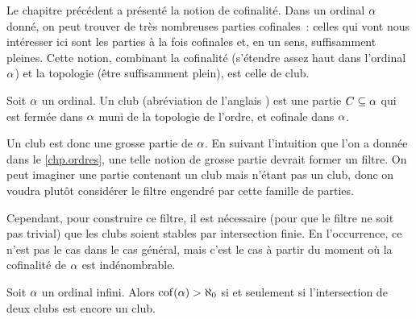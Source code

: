 Le chapitre précédent a présenté la notion de cofinalité. Dans un ordinal
$\alpha$ donné, on peut trouver de très nombreuses parties cofinales~: celles
qui vont nous intéresser ici sont les parties à la fois cofinales et, en un
sens, \og suffisamment pleines\fg. Cette notion, combinant la cofinalité
(s'étendre assez haut dans l'ordinal $\alpha$) et la topologie (être
suffisamment plein), est celle de club.

\begin{definition}[Club]
  Soit $\alpha$ un ordinal. Un club (abréviation de l'anglais
  ) est une partie $C\subseteq\alpha$ qui
  est fermée dans $\alpha$ muni de la topologie de l'ordre, et cofinale dans
  $\alpha$.
\end{definition}

Un club est donc une grosse partie de $\alpha$. En suivant l'intuition que l'on
a donnée dans le \cref{chp.ordres}, une telle notion de grosse partie devrait
former un filtre. On peut imaginer une partie contenant un club mais n'étant pas
un club, donc on voudra plutôt considérer le filtre engendré par cette famille
de parties.

Cependant, pour construire ce filtre, il est nécessaire (pour que le filtre ne
soit pas trivial) que les clubs soient stables par intersection finie. En
l'occurrence, ce n'est pas le cas dans le cas général, mais c'est le cas à
partir du moment où la cofinalité de $\alpha$ est indénombrable.

\begin{proposition}
  Soit $\alpha$ un ordinal infini. Alors $\operatorname{cof}(\alpha) > \aleph_0$ si et
  seulement si l'intersection de deux clubs est encore un club.
\end{proposition}

